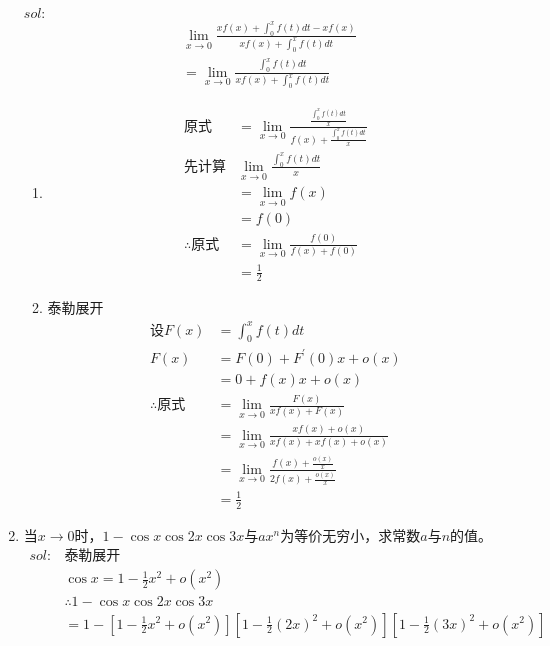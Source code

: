 \begin{enumerate}[{例}1.]
        $sol:$
        \begin{align*}
            &\lim_{x \to 0}\frac{xf(x)+\int_0^x f(t)dt-xf(x)}{xf(x)+\int_0^x f(t)dt}\\
            &=\lim_{x \to 0}\frac{\int_0^x f(t)dt}{xf(x)+\int_0^x f(t)dt}
        \end{align*}
        \begin{enumerate}[$1^\circ$]
            \item 
                \begin{align*}
                    \mbox{原式}&=\lim_{x \to 0}\frac{\frac{\int_0^x f(t)dt}{x}}{f(x)+\frac{\int_0^x f(t) dt}{x}}\\
                    \mbox{先计算}&\lim_{x \to 0}\frac{\int_0^x f(t) dt}{x}\\
                    &=\lim_{x \to 0}f(x)\\
                    &=f(0)\\
                    \therefore\mbox{原式}&=\lim_{x \to 0}\frac{f(0)}{f(x)+f(0)}\\
                    &=\frac{1}{2}
                \end{align*}
            \item 泰勒展开
                \begin{align*}
                    \mbox{设}F(x)&=\int_0^x f(t)dt\\
                    F(x)&=F(0)+F^{\prime}(0)x+o(x)\\
                    &=0+f(x)x+o(x)\\
                    \therefore\mbox{原式}&=\lim_{x \to 0}\frac{F(x)}{xf(x)+F(x)}\\
                    &=\lim_{x \to 0}\frac{xf(x)+o(x)}{xf(x)+xf(x)+o(x)}\\
                    &=\lim_{x \to 0}\frac{f(x)+\frac{o(x)}{x}}{2f(x)+\frac{o(x)}{x}}\\
                    &=\frac{1}{2}
                \end{align*}
        \end{enumerate}
    \item 当$x\to0$时，$1-\cos x\cos 2x\cos 3x$与$ax^n$为等价无穷小，求常数$a$与$n$的值。
        \begin{align*}
            sol:&\mbox{泰勒展开}\\
                &\cos x=1-\frac{1}{2}x^2+o(x^2)\\
                &\therefore 1-\cos x \cos 2x \cos 3x\\
                &=1-[1-\frac{1}{2}x^2+o(x^2)][1-\frac{1}{2}(2x)^2+o(x^2)][1-\frac{1}{2}(3x)^2+o(x^2)]\\

\end{align*}
\end{enumerate}

